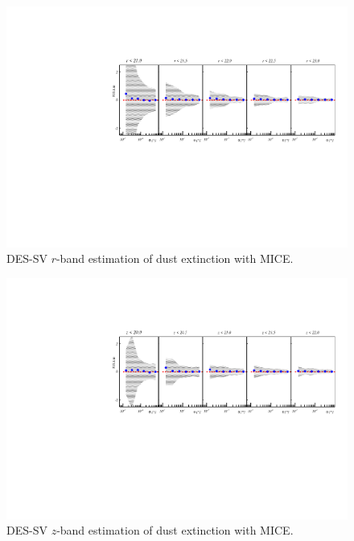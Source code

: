 \begin{figure}
\includegraphics[width=\textwidth,trim={0 2.3cm 0 3.5cm},clip]{./figures_appendix/mag_rdust.pdf}
\caption{DES-SV $r$-band estimation of dust extinction with MICE.}
\end{figure}

\begin{figure}
\includegraphics[width=\textwidth,trim={0 2.3cm 0 3.5cm},clip]{./figures_appendix/mag_zdust.pdf}
\caption{DES-SV $z$-band estimation of dust extinction with MICE.}
\end{figure}

